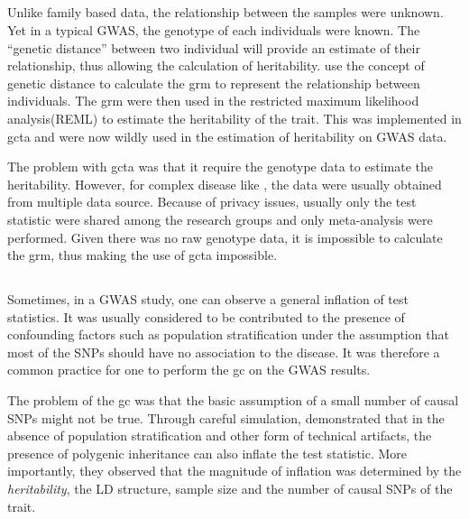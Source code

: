 
	\subsection{}
	Unlike family based data, the relationship between the samples were unknown. 
	Yet in a typical \gls{GWAS}, the genotype of each individuals were known.
	The ``genetic distance'' between two individual will provide an estimate of their relationship, thus allowing the calculation of heritability.
	\citet{Yang2011} use the concept of genetic distance to calculate the \gls{grm} to represent the relationship between individuals.
	The \gls{grm} were then used in the restricted maximum likelihood analysis(REML) to estimate the heritability of the trait\citep{Yang2011}.
	This was implemented in \gls{gcta} and were now wildly used in the estimation of heritability on \gls{GWAS} data.
	
	The problem with \gls{gcta} was that it require the genotype data to estimate the heritability.
	However, for complex disease like , the data were usually obtained from multiple data source.
	Because of privacy issues, usually only the test statistic were shared among the research groups and only meta-analysis were performed.
	Given there was no raw genotype data, it is impossible to calculate the \gls{grm}, thus making the use of \gls{gcta} impossible.
	  
	\subsection{}
	Sometimes, in a \gls{GWAS} study, one can observe a general inflation of test statistics. 
	It was usually considered to be contributed to the presence of confounding factors such as population stratification under the assumption that most of the \glspl{SNP} should have no association to the disease.
	It was therefore a common practice for one to perform the \gls{gc} on the \gls{GWAS} results\citep{Zheng2006}.
	
	The problem of the \gls{gc} was that the basic assumption of a small number of causal \glspl{SNP} might not be true. 
	Through careful simulation, \citet{Yang2011b} demonstrated that in the absence of population stratification and other form of technical artifacts, the presence of polygenic inheritance can also inflate the test statistic\citep{Yang2011b}.
	More importantly, they observed that the magnitude of inflation was determined by the \emph{heritability}, the \gls{LD} structure, sample size and the number of causal \glspl{SNP} of the trait.

